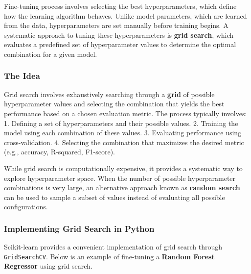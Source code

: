 \documentclass{article}
\begin{document}
    Fine-tuning process involves selecting the best hyperparameters, which
define how the learning algorithm behaves. Unlike model parameters,
which are learned from the data, hyperparameters are set manually before
training begins. A systematic approach to tuning these hyperparameters
is \textbf{grid search}, which evaluates a predefined set of
hyperparameter values to determine the optimal combination for a given
model.

\subsubsection{The Idea}\label{the-idea}

Grid search involves exhaustively searching through a \textbf{grid} of
possible hyperparameter values and selecting the combination that yields
the best performance based on a chosen evaluation metric. The process
typically involves: 1. Defining a set of hyperparameters and their
possible values. 2. Training the model using each combination of these
values. 3. Evaluating performance using cross-validation. 4. Selecting
the combination that maximizes the desired metric (e.g., accuracy,
R-squared, F1-score).

While grid search is computationally expensive, it provides a systematic
way to explore hyperparameter space. When the number of possible
hyperparameter combinations is very large, an alternative approach known
as \textbf{random search} can be used to sample a subset of values
instead of evaluating all possible configurations.

\subsubsection{Implementing Grid Search in
Python}\label{implementing-grid-search-in-python}

Scikit-learn provides a convenient implementation of grid search through
\texttt{GridSearchCV}. Below is an example of fine-tuning a
\textbf{Random Forest Regressor} using grid search.
\end{document}
